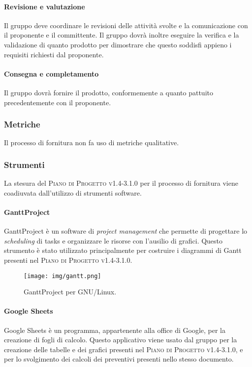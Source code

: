 \documentclass[../norme-di-progetto.tex]{subfiles}
\begin{document}
\paragraph{Revisione e valutazione}
Il gruppo deve coordinare le revisioni delle attività svolte e la comunicazione con il proponente e il committente. Il gruppo dovrà inoltre eseguire la verifica e la validazione di quanto prodotto per dimostrare che questo soddisfi appieno i requisiti richiesti dal proponente.

\paragraph{Consegna e completamento}
Il gruppo dovrà fornire il prodotto, conformemente a quanto pattuito precedentemente con il proponente.

\subsubsection{Metriche}
Il processo di fornitura non fa uso di metriche qualitative.

\subsubsection{Strumenti}
La stesura del \textsc{Piano di Progetto v1.4-3.1.0} per il processo di fornitura viene coadiuvata dall'utilizzo di strumenti software.

\paragraph{GanttProject}
GanttProject è un software di \textit{project management} che permette di progettare lo \textit{scheduling} di tasks e organizzare le risorse con l'ausilio di grafici. Questo strumento è stato utilizzato principalmente per costruire i diagrammi di Gantt presenti nel \textsc{Piano di Progetto v1.4-3.1.0}.

\begin{figure}[H]
  \centering
  \texttt{[image: img/gantt.png]}
  \label{fig:gantt}
  \caption{GanttProject per GNU/Linux.}
\end{figure}

\paragraph{Google Sheets}
Google Sheets è un programma, appartenente alla  office di Google, per la creazione di fogli di calcolo. Questo applicativo viene usato dal gruppo per la creazione delle tabelle e dei grafici presenti nel \textsc{Piano di Progetto v1.4-3.1.0}, e per lo svolgimento dei calcoli dei preventivi presenti nello stesso documento.
\end{document}
